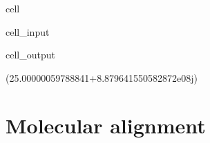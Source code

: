 \documentclass[letterpaper,table,10pt,english]{jupyterBook}
\begin{document}
\begin{sphinxuseclass}{cell}\begin{sphinxVerbatimInput}

\begin{sphinxuseclass}{cell_input}
\begin{sphinxVerbatim}[commandchars=\\\{\}]

      

\end{sphinxVerbatim}

\end{sphinxuseclass}\end{sphinxVerbatimInput}
\begin{sphinxVerbatimOutput}

\begin{sphinxuseclass}{cell_output}
\begin{sphinxVerbatim}[commandchars=\\\{\}]
(25.00000059788841+8.879641550582872e\PYGZhy{}08j)
\end{sphinxVerbatim}

\end{sphinxuseclass}\end{sphinxVerbatimOutput}

\end{sphinxuseclass}
\sphinxstepscope


\section{Molecular alignment}
\label{\detokenize{part1/theory_molecular_alignment_170723:molecular-alignment}}\label{\detokenize{part1/theory_molecular_alignment_170723:sect-theory-alignment}}\label{\detokenize{part1/theory_molecular_alignment_170723::doc}}
\end{document}
